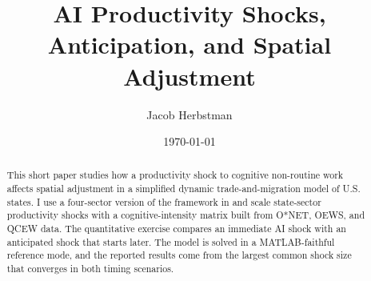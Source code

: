 \documentclass[11pt]{article}
\title{AI Productivity Shocks, Anticipation, and Spatial Adjustment}
\author{Jacob Herbstman}
\date{\today}
\begin{document}
\maketitle

\begin{abstract}
This short paper studies how a productivity shock to cognitive non-routine work affects
spatial adjustment in a simplified dynamic trade-and-migration model of U.S. states. I use
a four-sector version of the framework in \citet{caliendo2019trade} and scale state-sector
productivity shocks with a cognitive-intensity matrix built from O*NET, OEWS, and QCEW
data. The quantitative exercise compares an immediate AI shock with an anticipated shock
that starts later. The model is solved in a MATLAB-faithful reference mode, and the reported
results come from the largest common shock size that converges in both timing scenarios.
\end{abstract}








\end{document}
